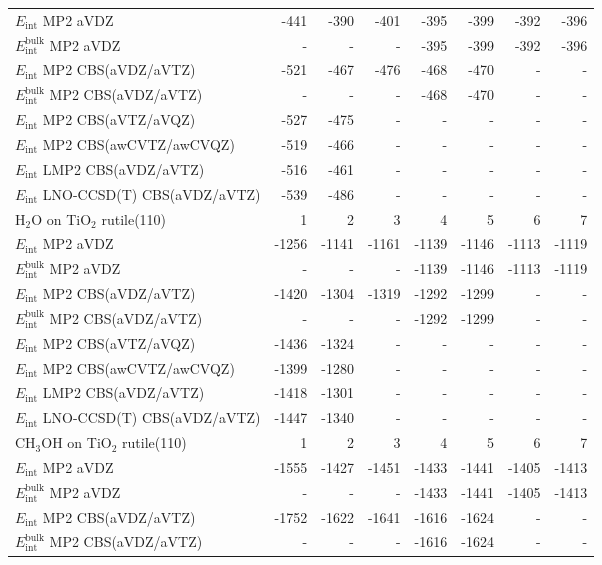 \begin{longtable}{lrrrrrrr}
\midrule
$E_\text{int}$ MP2 aVDZ & -441 & -390 & -401 & -395 & -399 & -392 & -396 \\
$E_\text{int}^\text{bulk}$ MP2 aVDZ & - & - & - & -395 & -399 & -392 & -396 \\
$E_\text{int}$ MP2 CBS(aVDZ/aVTZ) & -521 & -467 & -476 & -468 & -470 & - & - \\
$E_\text{int}^\text{bulk}$ MP2 CBS(aVDZ/aVTZ) & - & - & - & -468 & -470 & - & - \\
$E_\text{int}$ MP2 CBS(aVTZ/aVQZ) & -527 & -475 & - & - & - & - & - \\
$E_\text{int}$ MP2 CBS(awCVTZ/awCVQZ) & -519 & -466 & - & - & - & - & - \\
$E_\text{int}$ LMP2 CBS(aVDZ/aVTZ) & -516 & -461 & - & - & - & - & - \\
$E_\text{int}$ LNO-CCSD(T) CBS(aVDZ/aVTZ) & -539 & -486 & - & - & - & - & - \\
\toprule
H$_2$O on TiO$_2$ rutile(110) & 1 & 2 & 3 & 4 & 5 & 6 & 7 \\ 
\midrule
$E_\text{int}$ MP2 aVDZ & -1256 & -1141 & -1161 & -1139 & -1146 & -1113 & -1119 \\
$E_\text{int}^\text{bulk}$ MP2 aVDZ & - & - & - & -1139 & -1146 & -1113 & -1119 \\
$E_\text{int}$ MP2 CBS(aVDZ/aVTZ) & -1420 & -1304 & -1319 & -1292 & -1299 & - & - \\
$E_\text{int}^\text{bulk}$ MP2 CBS(aVDZ/aVTZ) & - & - & - & -1292 & -1299 & - & - \\
$E_\text{int}$ MP2 CBS(aVTZ/aVQZ) & -1436 & -1324 & - & - & - & - & - \\
$E_\text{int}$ MP2 CBS(awCVTZ/awCVQZ) & -1399 & -1280 & - & - & - & - & - \\
$E_\text{int}$ LMP2 CBS(aVDZ/aVTZ) & -1418 & -1301 & - & - & - & - & - \\
$E_\text{int}$ LNO-CCSD(T) CBS(aVDZ/aVTZ) & -1447 & -1340 & - & - & - & - & - \\
\toprule
CH$_3$OH on TiO$_2$ rutile(110) & 1 & 2 & 3 & 4 & 5 & 6 & 7 \\ 
\midrule
$E_\text{int}$ MP2 aVDZ & -1555 & -1427 & -1451 & -1433 & -1441 & -1405 & -1413 \\
$E_\text{int}^\text{bulk}$ MP2 aVDZ & - & - & - & -1433 & -1441 & -1405 & -1413 \\
$E_\text{int}$ MP2 CBS(aVDZ/aVTZ) & -1752 & -1622 & -1641 & -1616 & -1624 & - & - \\
$E_\text{int}^\text{bulk}$ MP2 CBS(aVDZ/aVTZ) & - & - & - & -1616 & -1624 & - & - \\

\end{longtable}
